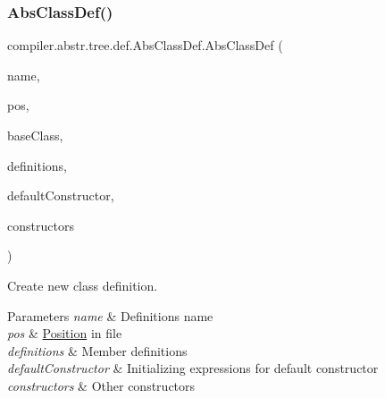 \subsubsection{\texorpdfstring{Abs\+Class\+Def()}{AbsClassDef()}\hspace{0.1cm}{\footnotesize\ttfamily [3/4]}}
{\footnotesize\ttfamily compiler.\+abstr.\+tree.\+def.\+Abs\+Class\+Def.\+Abs\+Class\+Def (\begin{DoxyParamCaption}\item[{String}]{name,  }\item[{\hyperlink{classcompiler_1_1_position}{Position}}]{pos,  }\item[{\hyperlink{classcompiler_1_1abstr_1_1tree_1_1type_1_1_abs_type}{Abs\+Type}}]{base\+Class,  }\item[{Linked\+List$<$ \hyperlink{classcompiler_1_1abstr_1_1tree_1_1def_1_1_abs_def}{Abs\+Def} $>$}]{definitions,  }\item[{Linked\+List$<$ \hyperlink{classcompiler_1_1abstr_1_1tree_1_1_abs_stmt}{Abs\+Stmt} $>$}]{default\+Constructor,  }\item[{Linked\+List$<$ \hyperlink{classcompiler_1_1abstr_1_1tree_1_1def_1_1_abs_fun_def}{Abs\+Fun\+Def} $>$}]{constructors }\end{DoxyParamCaption})}


\begin{DoxyItemize}
\item Create new class definition. 
\begin{DoxyParams}{Parameters}
{\em name} & Definition\textquotesingle{}s name \\
\hline
{\em pos} & \hyperlink{classcompiler_1_1_position}{Position} in file \\
\hline
{\em definitions} & Member definitions \\
\hline
{\em default\+Constructor} & Initializing expressions for default constructor \\
\hline
{\em constructors} & Other constructors \\
\hline
\end{DoxyParams}

\end{DoxyItemize}\mbox{\label{classcompiler_1_1abstr_1_1tree_1_1def_1_1_abs_class_def_a1aa7f855430f93f7a310a41ca1ea28cf}} 
